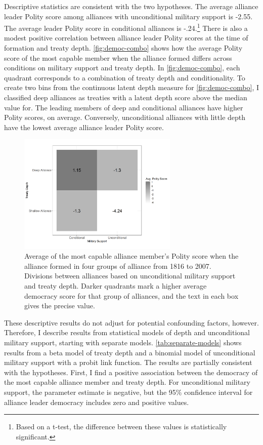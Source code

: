 \documentclass[12pt]{article}
\begin{document}
Descriptive statistics are consistent with the two hypotheses.
The average alliance leader Polity score among alliances with unconditional military support is -2.55. 
The average leader Polity score in conditional alliances is -.24.\footnote{Based on a t-test, the difference between these values is statistically significant.} 
There is also a modest positive correlation between alliance leader Polity scores at the time of formation and treaty depth. 
\autoref{fig:democ-combo} shows how the average Polity score of the most capable member when the alliance formed differs across conditions on military support and treaty depth.
In \autoref{fig:democ-combo}, each quadrant corresponds to a combination of treaty depth and conditionality. 
To create two bins from the continuous latent depth measure for \autoref{fig:democ-combo}, I classified deep alliances as treaties with a latent depth score above the median value for. 
The leading members of deep and conditional alliances have higher Polity scores, on average. 
Conversely, unconditional alliances with little depth have the lowest average alliance leader Polity score. 


\begin{figure}[hbtp]
\centering
\includegraphics[width=0.68\textwidth]{../figures/democ-combo.png}
\caption{Average of the most capable alliance member's Polity score when the alliance formed in four groups of alliance from 1816 to 2007. Divisions between alliances based on unconditional military support and treaty depth. Darker quadrants mark a higher average democracy score for that group of alliances, and the text in each box gives the precise value.}
\label{fig:democ-combo}
\end{figure}


These descriptive results do not adjust for potential confounding factors, however.
Therefore, I describe results from statistical models of depth and unconditional military support, starting with separate models. 
\autoref{tab:separate-models} shows results from a beta model of treaty depth and a binomial model of unconditional military support with a probit link function. 
The results are partially consistent with the hypotheses.
First, I find a positive association between the democracy of the most capable alliance member and treaty depth. 
For unconditional military support, the parameter estimate is negative, but the 95\% confidence interval for alliance leader democracy includes zero and positive values. 
\end{document}
